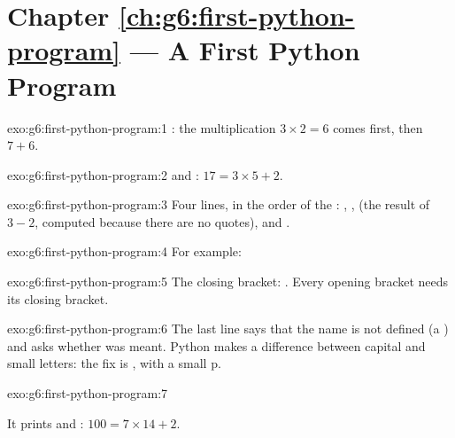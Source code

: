 \section*{Chapter \ref{ch:g6:first-python-program} --- A First Python Program}

\begin{solution}{exo:g6:first-python-program:1}
: the multiplication $3 \times 2 = 6$ comes first, then $7 + 6$.
\end{solution}

\begin{solution}{exo:g6:first-python-program:2}
 and : $17 = 3 \times 5 + 2$.
\end{solution}

\begin{solution}{exo:g6:first-python-program:3}
Four lines, in the order of the : , ,  (the
result of $3 - 2$, computed because there are no quotes), and .
\end{solution}

\begin{solution}{exo:g6:first-python-program:4}
For example:

\label{lst:g6:first-python-program:sol-poster}
\end{solution}

\begin{solution}{exo:g6:first-python-program:5}
The closing bracket: . Every opening bracket needs its
closing bracket.
\end{solution}

\begin{solution}{exo:g6:first-python-program:6}
The last line says that the name  is not defined (a
) and asks whether  was meant. Python makes a difference between capital and small letters: the
fix is , with a small p.
\end{solution}

\begin{solution}{exo:g6:first-python-program:7}
\label{lst:g6:first-python-program:sol-weeks}

It prints  and : $100 = 7 \times 14 + 2$.
\end{solution}


